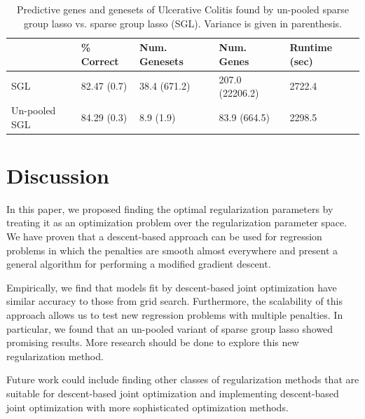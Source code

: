 \documentclass{statsoc}
\begin{document}
\begin{table}
\caption{\label{colitis} Predictive genes and genesets of Ulcerative Colitis found by un-pooled sparse group lasso vs. sparse group lasso (SGL). Variance is given in parenthesis.}
\centering
\begin{tabular}{| l | l | l | l | l | }
\hline
 & \% Correct  & Num. Genesets & Num. Genes & Runtime (sec) \\
\hline
SGL & 82.47 (0.7) & 38.4 (671.2) & 207.0 (22206.2) & 2722.4 \\
\hline
Un-pooled SGL & 84.29 (0.3) & 8.9 (1.9) & 83.9 (664.5) & 2298.5 \\
\hline
\end{tabular}
\end{table}

\section{Discussion}
In this paper, we proposed finding the optimal regularization parameters by treating it as an optimization problem over the regularization parameter space. We have proven that a descent-based approach can be used for regression problems in which the penalties are smooth almost everywhere and present a general algorithm for performing a modified gradient descent.

Empirically, we find that models fit by descent-based joint optimization have similar accuracy to those from grid search. Furthermore, the scalability of this approach allows us to test new regression problems with multiple penalties. In particular, we found that an un-pooled variant of sparse group lasso showed promising results. More research should be done to explore this new regularization method.

Future work could include finding other classes of regularization methods that are suitable for descent-based joint optimization and implementing descent-based joint optimization with more sophisticated optimization methods.

\bigskip


\end{document}
